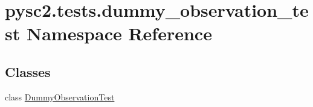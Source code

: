 \hypertarget{namespacepysc2_1_1tests_1_1dummy__observation__test}{}\section{pysc2.\+tests.\+dummy\+\_\+observation\+\_\+test Namespace Reference}
\label{namespacepysc2_1_1tests_1_1dummy__observation__test}
\subsection*{Classes}
\begin{DoxyCompactItemize}
\item 
class \mbox{\hyperlink{classpysc2_1_1tests_1_1dummy__observation__test_1_1_dummy_observation_test}{Dummy\+Observation\+Test}}
\end{DoxyCompactItemize}
